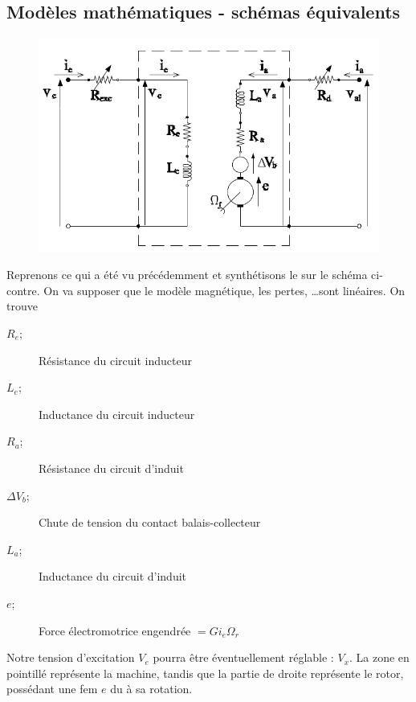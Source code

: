 	\subsection{Modèles mathématiques - schémas équivalents}
		\begin{figure}
	\includegraphics[scale=0.34]{ch4/image15.png}
	\end{figure}
	Reprenons ce qui a été vu précédemment et synthétisons le sur le schéma ci-contre. 
	On va supposer que le modèle magnétique, les pertes, \dots sont linéaires. On 
	trouve 
	\begin{description}
	\item[$R_e$;] Résistance du circuit inducteur
	\item[$L_e$;] Inductance du circuit inducteur
	\item[$R_a$;] Résistance du circuit d'induit
	\item[$\Delta V_b$;] Chute de tension du contact balais-collecteur
	\item[$L_a$;] Inductance du circuit d'induit
	\item[$e$;] Force électromotrice engendrée $= Gi_e\Omega_r$
\end{description}		
	Notre tension d'excitation $V_e$ pourra être éventuellement réglable : $V_x$. La 
	zone en pointillé représente la machine, tandis que la partie de droite représente 
	le rotor, possédant une fem $e$ du à sa rotation.\\
	
